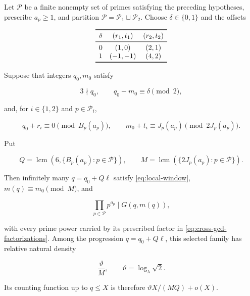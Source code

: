 \begin{proposition}
\label{prop:local-transfer}
Let $\mathcal P$ be a finite nonempty set of primes satisfying the preceding
hypotheses, prescribe $a_p\geqslant1$, and partition
$\mathcal P=\mathcal P_1\sqcup\mathcal P_2$. Choose
$\delta\in\{0,1\}$ and the offsets

\begin{equation}
\begin{array}{ccc}
 \toprule
 \delta&(r_1,t_1)&(r_2,t_2)\\
 \midrule
 0&(1,0)&(2,1)\\
 1&(-1,-1)&(4,2)\\
 \bottomrule
\end{array}
\label{eq:clock-offsets}
\end{equation}

Suppose that integers $q_0,m_0$ satisfy

\begin{equation}
 3\nmid q_0,
 \qquad
 q_0-m_0\equiv\delta\pmod2,
 \label{eq:clock-phase}
\end{equation}

and, for $i\in\{1,2\}$ and $p\in\mathcal P_i$,

\begin{equation}
 q_0+r_i\equiv0\pmod {B_p(a_p)},
 \qquad
 m_0+t_i\equiv J_p(a_p)\pmod {2J_p(a_p)}.
 \label{eq:clock-congruences}
\end{equation}

Put

\begin{equation}
 Q=\operatorname{lcm}\left(6,\{B_p(a_p):p\in\mathcal P\}\right),
 \qquad
 M=\operatorname{lcm}\left(\{2J_p(a_p):p\in\mathcal P\}\right).
 \label{eq:clock-moduli}
\end{equation}

Then infinitely many $q=q_0+Q\ell$ satisfy
\cref{eq:local-window}, $m(q)\equiv m_0\pmod M$, and

\begin{equation}
 \prod_{p\in\mathcal P}p^{a_p}\mid G(q,m(q)),
 \label{eq:clock-product}
\end{equation}

with every prime power carried by its prescribed factor in
\cref{eq:cross-gcd-factorizations}. Among the progression
$q=q_0+Q\ell$, this selected family has relative natural density

\begin{equation}
 \frac{\vartheta}{M},
 \qquad
 \vartheta=\log_\lambda\sqrt2.
 \label{eq:clock-relative-density}
\end{equation}

Its counting function up to $q\leqslant X$ is therefore
$\vartheta X/(MQ)+o(X)$.
\end{proposition}


